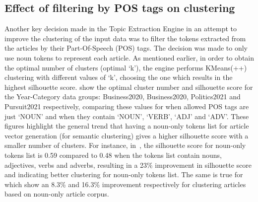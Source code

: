 \subsection{Effect of filtering by POS tags on clustering} \label{s:pos_clustering}
Another key decision made in the Topic Extraction Engine in an attempt to improve the clustering of the input data was to filter the tokens extracted from the articles by their Part-Of-Speech (POS) tags. The decision was made to only use noun tokens to represent each article. As mentioned earlier, in order to obtain the optimal number of clusters (optimal `k'), the engine performs KMeans(++) clustering with different values of `k', choosing the one which results in the highest silhouette score.  show the optimal cluster number and silhouette score for the Year-Category data groups: Business2020, Business2020, Politics2021 and Pursuit2021 respectively, comparing these values for when allowed POS tags are just `NOUN' and when they contain `NOUN', `VERB', `ADJ' and `ADV'. These figures highlight the general trend that having a noun-only tokens list for article vector generation (for semantic clustering) gives a higher silhouette score with a smaller number of clusters. For instance, in~, the silhouette score for noun-only tokens list is 0.59 compared to 0.48 when the tokens list contain nouns, adjectives, verbs and adverbs, resulting in a 23\% improvement in silhouette score and indicating better clustering for noun-only tokens list. The same is true for  which show an 8.3\% and 16.3\% improvement respectively for clustering articles based on noun-only article corpus.

